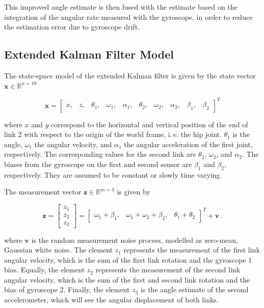 \noindent
This improved angle estimate is then fused with the estimate based on the integration of the angular rate measured with the gyroscope, in order to reduce the estimation error due to gyroscope drift.

\subsection{Extended Kalman Filter Model}\label{sec:EKF_model}

The state-space model of the extended Kalman filter is given by the state vector $\mathbf{x} \in \mathbb{R}^{n=10}$

\begin{equation} \label{eq:state_vector}
  \mathbf{x} = \begin{bmatrix}
  	x, & z, & \theta_1, & \omega_1, & \alpha_1, & \theta_2, & \omega_2, & \alpha_2, & \beta_1, & \beta_2
  \end{bmatrix}^T
\end{equation}

\noindent
where $x$ and $y$ correspond to the horizontal and vertical position of the end of link 2 with respect to the origin of the world frame, i.\,e. the hip joint. $\theta_1$ is the angle, $\omega_1$ the angular velocity, and $\alpha_1$ the angular acceleration of the first joint, respectively. The corresponding values for the second link are $\theta_2$, $\omega_2$, and $\alpha_2$. The biases from the gyroscope on the first and second sensor are $\beta_1$ and $\beta_2$, respectively. They are assumed to be constant or slowly time varying.

The measurement vector $\mathbf{z} \in \mathbb{R}^{m=3}$ is given by

\begin{equation} \label{eq:measurement_vector}
  \mathbf{z} = \begin{bmatrix} z_1 \\ z_2 \\ z_3 \end{bmatrix} = \begin{bmatrix}
  	\omega_1 + \beta_1, & \omega_1 + \omega_2 + \beta_2, & \theta_1 + \theta_2
  \end{bmatrix}^T + \mathbf{v}\,.
\end{equation}
 
\noindent
where $\mathbf{v}$ is the random measurement noise process, modelled as zero-mean, Gaussian white noise. The element $z_1$ represents the measurement of the first link angular velocity, which is the sum of the first link rotation and the gyroscope 1 bias. Equally, the element $z_2$ represents the measurement of the second link angular velocity, which is the sum of the first and second link rotation and the bias of gyroscope 2. Finally, the element $z_3$ is the angle estimate of the second accelerometer, which will see the angular displacement of both links.

